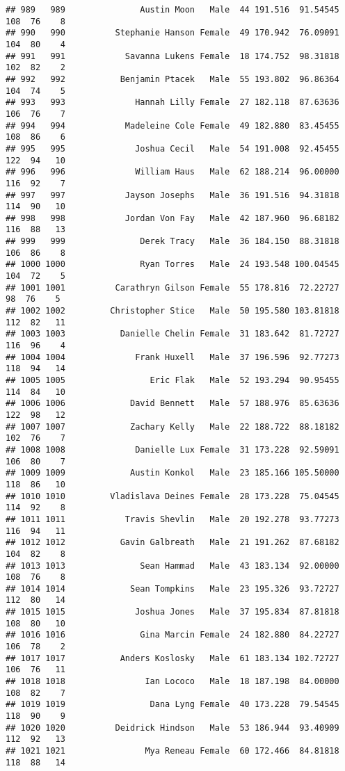 \documentclass[
]{article}
\begin{document}
\begin{verbatim}
## 989   989               Austin Moon   Male  44 191.516  91.54545 108  76    8
## 990   990          Stephanie Hanson Female  49 170.942  76.09091 104  80    4
## 991   991            Savanna Lukens Female  18 174.752  98.31818 102  82    2
## 992   992           Benjamin Ptacek   Male  55 193.802  96.86364 104  74    5
## 993   993              Hannah Lilly Female  27 182.118  87.63636 106  76    7
## 994   994            Madeleine Cole Female  49 182.880  83.45455 108  86    6
## 995   995              Joshua Cecil   Male  54 191.008  92.45455 122  94   10
## 996   996              William Haus   Male  62 188.214  96.00000 116  92    7
## 997   997            Jayson Josephs   Male  36 191.516  94.31818 114  90   10
## 998   998            Jordan Von Fay   Male  42 187.960  96.68182 116  88   13
## 999   999               Derek Tracy   Male  36 184.150  88.31818 106  86    8
## 1000 1000               Ryan Torres   Male  24 193.548 100.04545 104  72    5
## 1001 1001          Carathryn Gilson Female  55 178.816  72.22727  98  76    5
## 1002 1002         Christopher Stice   Male  50 195.580 103.81818 112  82   11
## 1003 1003           Danielle Chelin Female  31 183.642  81.72727 116  96    4
## 1004 1004              Frank Huxell   Male  37 196.596  92.77273 118  94   14
## 1005 1005                 Eric Flak   Male  52 193.294  90.95455 114  84   10
## 1006 1006             David Bennett   Male  57 188.976  85.63636 122  98   12
## 1007 1007             Zachary Kelly   Male  22 188.722  88.18182 102  76    7
## 1008 1008              Danielle Lux Female  31 173.228  92.59091 106  80    7
## 1009 1009             Austin Konkol   Male  23 185.166 105.50000 118  86   10
## 1010 1010         Vladislava Deines Female  28 173.228  75.04545 114  92    8
## 1011 1011            Travis Shevlin   Male  20 192.278  93.77273 116  94   11
## 1012 1012           Gavin Galbreath   Male  21 191.262  87.68182 104  82    8
## 1013 1013               Sean Hammad   Male  43 183.134  92.00000 108  76    8
## 1014 1014             Sean Tompkins   Male  23 195.326  93.72727 112  80   14
## 1015 1015              Joshua Jones   Male  37 195.834  87.81818 108  80   10
## 1016 1016               Gina Marcin Female  24 182.880  84.22727 106  78    2
## 1017 1017           Anders Koslosky   Male  61 183.134 102.72727 106  76   11
## 1018 1018                Ian Lococo   Male  18 187.198  84.00000 108  82    7
## 1019 1019                 Dana Lyng Female  40 173.228  79.54545 118  90    9
## 1020 1020          Deidrick Hindson   Male  53 186.944  93.40909 112  92   13
## 1021 1021                Mya Reneau Female  60 172.466  84.81818 118  88   14

\end{verbatim}
\end{document}
